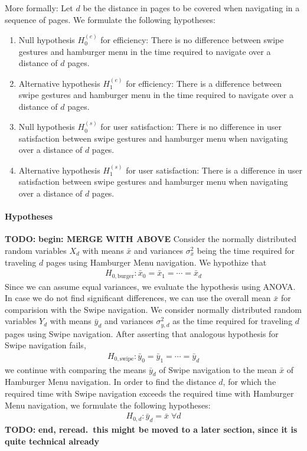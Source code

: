\documentclass{sig-alternate-05-2015}
\newcommand{\todo}{\textbf{TODO:} \textbf}
\begin{document}


More formally: Let $d$ be the distance in pages to be covered when navigating in a sequence of pages. We formulate the following hypotheses:
\begin{enumerate}
	\item Null hypothesis $H_0^{(e)}$ for efficiency:
	There is no difference between swipe gestures and hamburger menu in the
	time required to navigate over a distance of $d$ pages.
	\item Alternative hypothesis $H_1^{(e)}$ for efficiency: There is a
	difference between swipe gestures and hamburger menu in the time required
	to navigate over a distance of $d$ pages.
	\item Null hypothesis $H_0^{(s)}$ for user satisfaction: There is no
	difference in user satisfaction between swipe gestures and hamburger menu
	when navigating over a distance of $d$ pages.
	\item Alternative hypothesis $H_1^{(s)}$ for user satisfaction: There is a
	difference in user satisfaction between swipe gestures and hamburger menu
	when navigating over a distance of $d$ pages.
\end{enumerate}

\paragraph{Hypotheses}
\todo{begin: MERGE WITH ABOVE}
Consider the normally distributed random variables $X_d$ with means $\bar x$ and
variances $\sigma_x^2$ being the time required for traveling $d$ pages using Hamburger
Menu navigation.
We hypothize that
\begin{align*}
	H_{0, \text{burger}}: \bar x_0 = \bar x_1 = \cdots = \bar x_d
\end{align*}
Since we can assume equal variances,
we evaluate the hypothesis using {ANOVA}.
In case we do not find significant differences, we can use the overall mean
$\bar x$ for comparision with the Swipe navigation. 
We consider normally
distributed random variables $Y_d$ with means $\bar y_d$ and variances $\sigma_{y,d}^2$ as the
time required for traveling $d$ pages using Swipe navigation. 
After asserting
that analogous hypothesis for Swipe navigation fails,
\begin{align*}
	H_{0, \text{swipe}}: \bar y_0 = \bar y_1= \cdots = \bar y_d
\end{align*}
we continue with comparing the means $\bar y_d$ of Swipe navigation to the
mean $\bar x$ of Hamburger Menu navigation.  In order to find the distance
$d$, for which the required time with Swipe navigation exceeds the required
time with Hamburger Menu navigation, we formulate the following hypotheses:
\begin{align*}
	H_{0,d} : \bar y_d = \bar x \;\forall d
\end{align*}
\todo{end, reread.\ this might be moved to a later section, since it is
	quite technical already}
\end{document}

